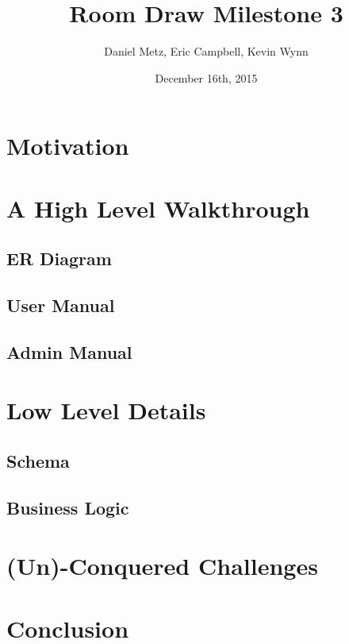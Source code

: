 \documentclass{article}
\title{Room Draw Milestone 3}
\author{Daniel Metz, Eric Campbell, Kevin Wynn}
\date{December 16th, 2015}
\begin{document}
\maketitle

\section{Motivation}


% 

\section{A High Level Walkthrough}
  \subsection{ER Diagram}
  

  \subsection{User Manual}
  

  \subsection{Admin Manual}
  

\section{Low Level Details}
  \subsection{Schema}
  

  \subsection{Business Logic}
  

\section{(Un)-Conquered Challenges}
  

\section{Conclusion}
\end{document}
